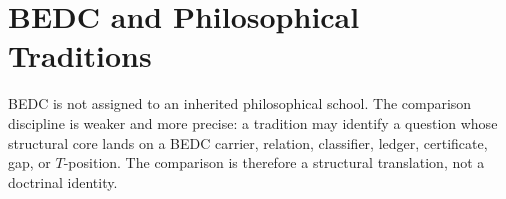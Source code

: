 \section{BEDC and Philosophical Traditions}
\label{sec:visions-philosophy-traditions}

BEDC is not assigned to an inherited philosophical school. The
comparison discipline is weaker and more precise: a tradition may
identify a question whose structural core lands on a BEDC carrier,
relation, classifier, ledger, certificate, gap, or \(T\)-position.
The comparison is therefore a structural translation, not a doctrinal
identity.







